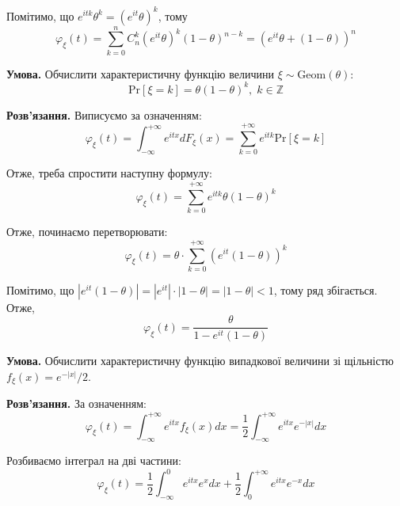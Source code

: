 \documentclass[oneside,solution]{karazin-prob-theory-assign}
\begin{document}
Помітимо, що $e^{itk}\theta^k = (e^{it}\theta)^k$, тому
\begin{equation}
    \varphi_{\xi}(t) = \sum_{k=0}^n C_n^k (e^{it}\theta)^k(1-\theta)^{n-k} = \boxed{(e^{it}\theta + (1-\theta))^n}
\end{equation}


\hspace{20px}\textbf{Умова.} Обчислити характеристичну функцію величини $\xi \sim \text{Geom}(\theta)$:
\begin{equation}
    \text{Pr}[\xi=k] = \theta(1-\theta)^k, \; k \in \mathbb{Z}
\end{equation}

\textbf{Розв'язання.} Виписуємо за означенням:
\begin{equation}
    \varphi_{\xi}(t) = \int_{-\infty}^{+\infty}e^{itx}dF_{\xi}(x) = \sum_{k=0}^{+\infty}e^{itk}\text{Pr}[\xi=k]
\end{equation}

Отже, треба спростити наступну формулу:
\begin{equation}
    \varphi_{\xi}(t) = \sum_{k=0}^{+\infty}e^{itk}\theta(1-\theta)^k
\end{equation}

Отже, починаємо перетворювати:
\begin{equation}
    \varphi_{\xi}(t) = \theta \cdot \sum_{k=0}^{+\infty}\left(e^{it}(1-\theta)\right)^k
\end{equation}

Помітимо, що $|e^{it}(1-\theta)| = |e^{it}|\cdot|1-\theta| = |1-\theta| < 1$, тому ряд збігається. Отже,
\begin{equation}
    \boxed{\varphi_{\xi}(t) = \frac{\theta}{1 - e^{it}(1-\theta)}}
\end{equation}


\hspace{20px}\textbf{Умова.} Обчислити характеристичну функцію випадкової величини зі щільністю $f_{\xi}(x) = e^{-|x|}/2$. 

\textbf{Розв'язання.} За означенням:
\begin{equation}
    \varphi_{\xi}(t) = \int_{-\infty}^{+\infty}e^{itx}f_{\xi}(x)dx = \frac{1}{2}\int_{-\infty}^{+\infty}e^{itx}e^{-|x|}dx
\end{equation}

Розбиваємо інтеграл на дві частини:
\begin{equation}
    \varphi_{\xi}(t) = \frac{1}{2}\int_{-\infty}^0 e^{itx}e^{x}dx + \frac{1}{2}\int_0^{+\infty}e^{itx}e^{-x}dx
\end{equation}
\end{document}

